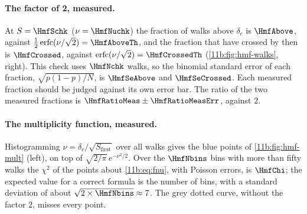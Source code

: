 \paragraph{The factor of 2, measured.}
At $S=\HmfSchk$ ($\nu=\HmfNuchk$) the fraction of walks above $\delta_c$ is
$\HmfAbove$, against $\tfrac12\operatorname{erfc}(\nu/\sqrt2)=\HmfAboveTh$, and the
fraction that have crossed by then is $\HmfCrossed$, against
$\operatorname{erfc}(\nu/\sqrt2)=\HmfCrossedTh$ (\cref{11b:fig:hmf-walks}, right).
This check uses $\HmfNchk$ walks, so the binomial standard error of each fraction,
$\sqrt{p(1-p)/N}$, is $\HmfSeAbove$ and $\HmfSeCrossed$. Each measured fraction
should be judged against its own error bar. The ratio of the two measured
fractions is $\HmfRatioMeas\pm\HmfRatioMeasErr$, against $2$.

\paragraph{The multiplicity function, measured.}
Histogramming $\nu=\delta_c/\sqrt{S_{\text{first}}}$ over all walks gives the
blue points of \cref{11b:fig:hmf-mult} (left), on top of
$\sqrt{2/\pi}\,e^{-\nu^2/2}$. Over the $\HmfNbins$ bins with more than fifty walks
the $\chi^2$ of the points about \eqref{11b:eq:fnu}, with Poisson errors, is
$\HmfChi$; the expected value for a correct formula is the number of bins, with a
standard deviation of about $\sqrt{2\times\HmfNbins}\approx7$. The grey dotted
curve, without the factor $2$, misses every point.

